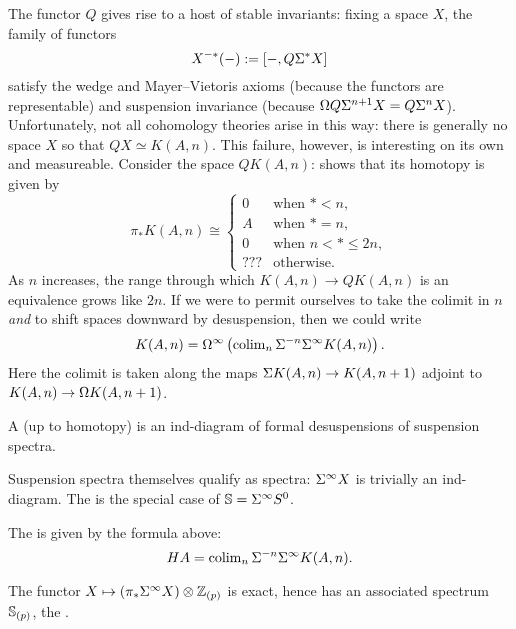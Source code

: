 The functor $Q$ gives rise to a host of stable invariants: fixing a space $X$, the family of functors \[X^{-*}(-) := [-, Q \Susp^* X]\] satisfy the wedge and Mayer--Vietoris axioms (because the functors are representable) and suspension invariance (because $\Loops Q \Susp^{n+1} X = Q \Susp^n X$).
Unfortunately, not all cohomology theories arise in this way: there is generally no space $X$ so that $QX \simeq K(A, n)$.
This failure, however, is interesting on its own and measureable.
Consider the space $QK(A, n)$:  shows that its homotopy is given by \[\pi_* K(A, n) \cong \begin{cases} 0 & \text{when $* < n$}, \\ A & \text{when $* = n$}, \\ 0 & \text{when $n < * \le 2n$}, \\ ??? & \text{otherwise}. \end{cases}\]
As $n$ increases, the range through which $K(A, n) \to QK(A, n)$ is an equivalence grows like $2n$.
If we were to permit ourselves to take the colimit in $n$ \emph{and} to shift spaces downward by desuspension, then we could write \[K(A, n) = \Loops^\infty \left( \colim_n \Susp^{-n} \Susp^\infty K(A, n) \right).\]
Here the colimit is taken along the maps $\Susp K(A, n) \to K(A, n+1)$ adjoint to $K(A, n) \to \Loops K(A, n+1)$.

\begin{definition}
A  (up to homotopy) is an ind-diagram of formal desuspensions of suspension spectra.
\end{definition}

\begin{example}
Suspension spectra themselves qualify as spectra: $\Susp^\infty X$ is trivially an ind-diagram.
The  is the special case of $\S = \Susp^\infty S^0$.
\end{example}

\begin{example}
The  is given by the formula above: \[HA = \colim_n \Susp^{-n} \Susp^\infty K(A, n).\]
\end{example}

\begin{example}
The functor $X \mapsto (\pi_* \Susp^\infty X) \otimes \Z_{(p)}$ is exact, hence has an associated spectrum $\S_{(p)}$, the .
\end{example}

